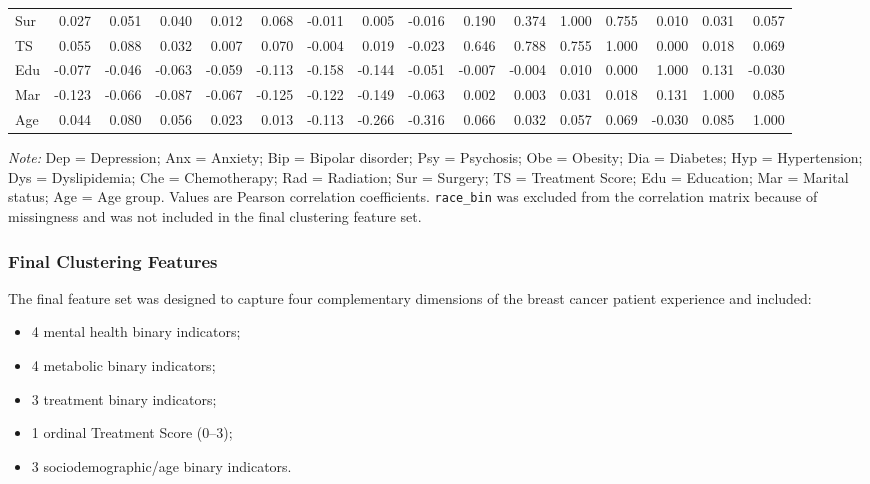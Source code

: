 \documentclass[11pt]{article}
\begin{document}
\begin{table}[H]
\begin{adjustbox}{max width=\textwidth}
\begin{tabular}{lrrrrrrrrrrrrrrr}
Sur &
0.027 & 0.051 & 0.040 & 0.012 & 0.068 & -0.011 &
0.005 & -0.016 & 0.190 & 0.374 & 1.000 & 0.755 &
0.010 & 0.031 & 0.057 \\

TS &
0.055 & 0.088 & 0.032 & 0.007 & 0.070 & -0.004 &
0.019 & -0.023 & 0.646 & 0.788 & 0.755 & 1.000 &
0.000 & 0.018 & 0.069 \\

Edu &
-0.077 & -0.046 & -0.063 & -0.059 & -0.113 & -0.158 &
-0.144 & -0.051 & -0.007 & -0.004 & 0.010 & 0.000 &
1.000 & 0.131 & -0.030 \\

Mar &
-0.123 & -0.066 & -0.087 & -0.067 & -0.125 & -0.122 &
-0.149 & -0.063 & 0.002 & 0.003 & 0.031 & 0.018 &
0.131 & 1.000 & 0.085 \\

Age &
0.044 & 0.080 & 0.056 & 0.023 & 0.013 & -0.113 &
-0.266 & -0.316 & 0.066 & 0.032 & 0.057 & 0.069 &
-0.030 & 0.085 & 1.000 \\

\bottomrule
\end{tabular}
\end{adjustbox}

\vspace{2mm}

\begin{flushleft}
\footnotesize
\textit{Note:} Dep = Depression; Anx = Anxiety; Bip = Bipolar disorder;
Psy = Psychosis; Obe = Obesity; Dia = Diabetes; Hyp = Hypertension;
Dys = Dyslipidemia; Che = Chemotherapy; Rad = Radiation; Sur = Surgery;
TS = Treatment Score; Edu = Education; Mar = Marital status;
Age = Age group. Values are Pearson correlation coefficients.
\texttt{race\_bin} was excluded from the correlation matrix because of
missingness and was not included in the final clustering feature set.
\end{flushleft}

\end{table}



\subsubsection{Final Clustering Features}

The final feature set was designed to capture four complementary dimensions of the breast cancer patient experience and included:

\begin{itemize}
\item 4 mental health binary indicators;
\item 4 metabolic binary indicators;
\item 3 treatment binary indicators;
\item 1 ordinal Treatment Score (0--3);
\item 3 sociodemographic/age binary indicators.
\end{itemize}
\end{document}
